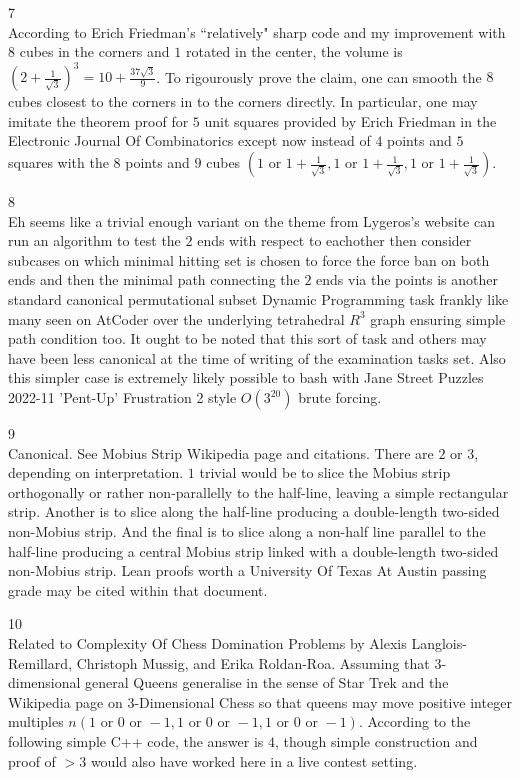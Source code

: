 7 \\
According to Erich Friedman's ``relatively" sharp code and my improvement with $8$ cubes in the corners and $1$ rotated in the center, the volume is $\left( 2 + \frac{1}{\sqrt{3}} \right)^3 = \boxed{10 + \frac{37 \sqrt{3}}{9}}$. To rigourously prove the claim, one can smooth the $8$ cubes closest to the corners in to the corners directly. In particular, one may imitate the theorem proof for $5$ unit squares provided by Erich Friedman in the Electronic Journal Of Combinatorics except now instead of $4$ points and $5$ squares with the $8$ points and $9$ cubes $\left( 1 \text{ or }1+\frac{1}{\sqrt{3}},1 \text{ or }1+\frac{1}{\sqrt{3}},1 \text{ or }1+\frac{1}{\sqrt{3}} \right)$.

8 \\
Eh seems like a trivial enough variant on the theme from Lygeros's website can run an algorithm to test the $2$ ends with respect to eachother then consider subcases on which minimal hitting set is chosen to force the force ban on both ends and then the minimal path connecting the $2$ ends via the points is another standard canonical permutational subset Dynamic Programming task frankly like many seen on AtCoder over the underlying tetrahedral $R^3$ graph ensuring simple path condition too. It ought to be noted that this sort of task and others may have been less canonical at the time of writing of the examination tasks set. Also this simpler case is extremely likely possible to bash with Jane Street Puzzles 2022-11 'Pent-Up' Frustration 2 style $O\left( 3^20 \right)$ brute forcing.

9 \\
Canonical. See Mobius Strip Wikipedia page and citations. There are $2$ or $\boxed{3}$, depending on interpretation. $1$ trivial would be to slice the Mobius strip orthogonally or rather non-parallelly to the half-line, leaving a simple rectangular strip. Another is to slice along the half-line producing a double-length two-sided non-Mobius strip. And the final is to slice along a non-half line parallel to the half-line producing a central Mobius strip linked with a double-length two-sided non-Mobius strip. Lean proofs worth a University Of Texas At Austin passing grade may be cited within that document.

10 \\
Related to Complexity Of Chess Domination Problems by Alexis Langlois-Remillard, Christoph Mussig, and Erika Roldan-Roa. Assuming that $3$-dimensional general Queens generalise in the sense of Star Trek and the Wikipedia page on $3$-Dimensional Chess so that queens may move positive integer multiples $n(1\text{ or }0\text{ or }-1,1\text{ or }0\text{ or }-1,1\text{ or }0\text{ or }-1)$. According to the following simple C++ code, the answer is $\boxed{4}$, though simple construction and proof of $>3$ would also have worked here in a live contest setting.

